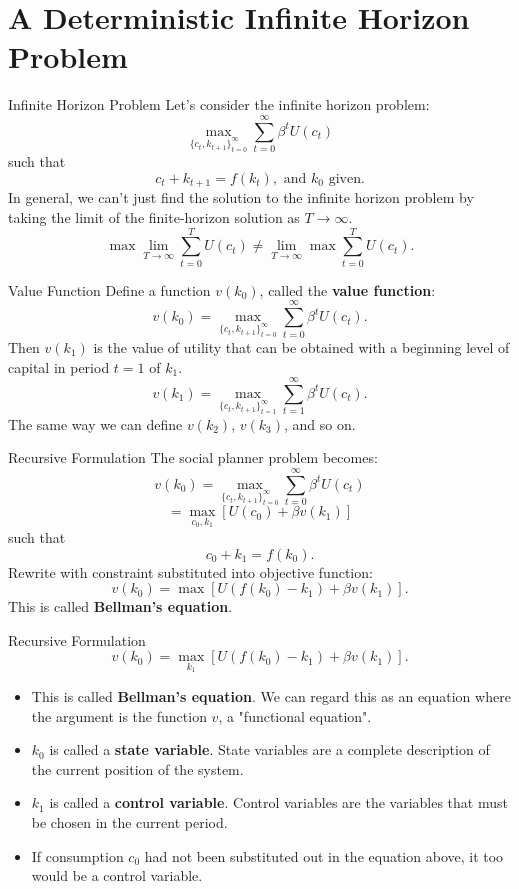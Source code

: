 \documentclass{beamer}
\begin{document}
\section{A Deterministic Infinite Horizon Problem}
\begin{frame}{Infinite Horizon Problem}
    Let's consider the infinite horizon problem:
     \[\max_{\{c_t, k_{t+1}\}_{t=0}^\infty} \sum_{t=0}^\infty \beta^t U(c_t)
    \]
    such that 
     \[c_t+k_{t+1}=f(k_t), \text{ and }k_0 \text{ given.}
    \]
In  general, we can't just find the solution to the infinite horizon problem by taking the limit of the finite-horizon solution as $T\to \infty$.    
    \[\max \lim_{T\to \infty} \sum_{t=0}^T  U(c_t) \neq  \lim_{T\to \infty}\max  \sum_{t=0}^T  U(c_t).
    \]
\end{frame}
\begin{frame}{Value Function}
    Define a function $v(k_0)$, called the \textbf{value function}:
    \[ v(k_0)=\max_{\{c_t, k_{t+1}\}_{t=0}^\infty} \sum_{t=0}^\infty \beta^t U(c_t).
    \]
    Then $v(k_1)$ is the value of utility that can be obtained with a beginning level of capital in period $t=1$ of $k_1$. 
    \[v(k_1)=\max_{\{c_t, k_{t+1}\}_{t=1}^\infty} \sum_{t=1}^\infty \beta^t U(c_t).
    \]
    The same way we can define $v(k_2)$, $v(k_3)$, and so on. 
\end{frame}
\begin{frame}{Recursive Formulation}
    The social planner problem becomes:
    \[ v(k_0)=\max_{\{c_t, k_{t+1}\}_{t=0}^\infty} \sum_{t=0}^\infty \beta^t U(c_t)
    \]
    \[= \max_{c_0, k_1}[U(c_0)+\beta v(k_1)]
    \]
    such that 
    \[c_0+k_1=f(k_0).
    \]
    Rewrite with constraint substituted into objective function:
    \[v(k_0)=\max \left[ U(f(k_0)-k_1)+\beta v(k_1)\right].
    \]
    This is called \textbf{Bellman's equation}.
    \end{frame}
\begin{frame}{Recursive Formulation}
 \[v(k_0)=\max_{k_1} \left[ U(f(k_0)-k_1)+\beta v(k_1)\right].
    \]
 \begin{itemize}
     \item  This is called \textbf{Bellman's equation}. We can regard this as an equation where the argument is the function $v$, a "functional equation".
     \item $k_0$ is called a \textbf{state variable}.  State variables are a complete description of the current position of the system. 
     \item $k_1$ is called a \textbf{control variable}. Control variables are the variables that must be chosen in the current period. 
     \item If consumption $c_0$ had not been substituted out in the equation above, it too would be a control variable. 
 \end{itemize}  
    \end{frame}
\end{document}
